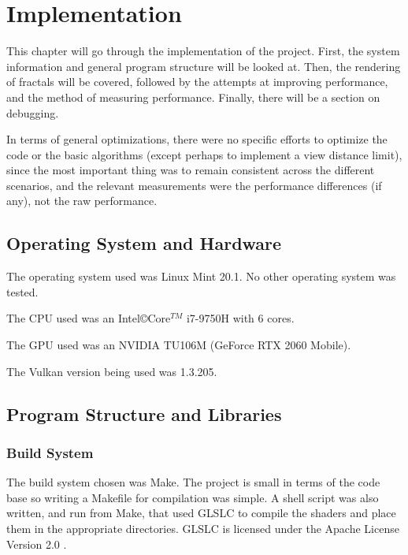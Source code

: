 \chapter{Implementation}
\label{chapter3}

This chapter will go through the implementation of the project. First, the system information and general program structure will be looked at. Then, the rendering of fractals will be covered, followed by the attempts at improving performance, and the method of measuring performance. Finally, there will be a section on debugging.\newline

In terms of general optimizations, there were no specific efforts to optimize the code or the basic algorithms (except perhaps to implement a view distance limit), since the most important thing was to remain consistent across the different scenarios, and the relevant measurements were the performance differences (if any), not the raw performance.

\section{Operating System and Hardware}

The operating system used was Linux Mint 20.1. No other operating system was tested.\newline

The CPU used was an Intel\copyright Core$^{TM}$ i7-9750H with 6 cores.

The GPU used was an NVIDIA TU106M (GeForce RTX 2060 Mobile).

The Vulkan version being used was 1.3.205.

\section{Program Structure and Libraries}

\subsection{Build System}

The build system chosen was Make. The project is small in terms of the code base so writing a Makefile for compilation was simple. A shell script was also written, and run from Make, that used GLSLC to compile the shaders and place them in the appropriate directories. GLSLC is licensed under the Apache License Version 2.0 \cite{licensing-glslc}.

